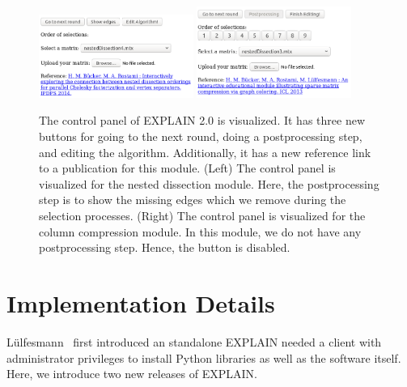 \documentclass[12pt, twoside,a4paper,toc=bibliography]{scrbook}
\begin{document}
\begin{figure}
\centering
\includegraphics[width=0.45\textwidth]{bottom_new_explain1}
\hfill
\includegraphics[width=0.45\textwidth]{bottom_new_explain}
\caption{The control panel of EXPLAIN 2.0 is visualized.
It has three new buttons for going to the next round,
doing a postprocessing step, and editing the algorithm.
Additionally, it has a new reference link to a publication
for this module.
(Left) The control panel is visualized for the nested dissection module.
Here, the postprocessing step is to show the missing edges which we remove
during the selection processes. 
(Right) The control panel is visualized for the column compression module. 
In this module, we do not have any postprocessing step. Hence, the button is disabled.}
\label{f.bottom_new_explain}
\end{figure}
\section{Implementation Details}
\label{s.impl.explain}
Lülfesmann~\cite{Lulfesmann2010} first introduced an standalone EXPLAIN needed a client with administrator privileges to install Python libraries as well as the software itself.
Here, we introduce two new releases of EXPLAIN.
\end{document}
